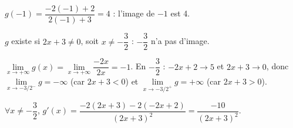 \documentclass[11pt]{article}
\begin{document}
\begin{questions}
  \item \begin{sousq}
    \item $g(-1) = \dfrac{-2(-1)+2}{2(-1)+3} = 4$ : l'image de $-1$ est 4.
    \item $g$ existe si $2x + 3 \ne 0$, soit $x \ne -\dfrac{3}{2}$ : $-\dfrac{3}{2}$ n'a pas d'image.
  \end{sousq}
  \item $\lim\limits_{x\to+\infty} g(x) = \lim\limits_{x\to+\infty}\dfrac{-2x}{2x} = -1$. En $-\dfrac{3}{2}$ : $-2x+2 \to 5$ et $2x+3 \to 0$, donc $\lim\limits_{x\to-3/2^-} g = -\infty$ (car $2x+3 < 0$) et $\lim\limits_{x\to-3/2^+} g = +\infty$ (car $2x+3 > 0$).
  \item \begin{sousq}
    \item $\forall x \ne -\dfrac{3}{2}$, $g'(x) = \dfrac{-2(2x+3) - 2(-2x+2)}{(2x+3)^2} = \dfrac{-10}{(2x+3)^2}$.


\end{sousq}
\end{questions}
\end{document}
